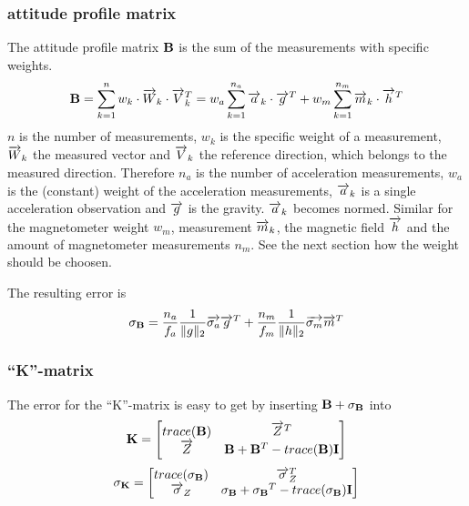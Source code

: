 \subsubsection*{attitude profile matrix}
The attitude profile matrix $ \mathbf{B} $ is the sum of the measurements with specific weights.
\begin{equation}\label{attitude profile matrix}
\mathbf{B} = \sum_{k=1}^n w_k \cdot \overrightarrow{W}_k \cdot \overrightarrow{V}_k^{T} = w_a \sum_{k=1}^{n_a} \overrightarrow{a}_k \cdot \overrightarrow{g}^{T}  +  w_m \sum_{k=1}^{n_m} \overrightarrow{m}_k \cdot \overrightarrow{h}^{T}
\end{equation}
$n$ is the number of measurements, $w_k$ is the specific weight of a measurement, $\overrightarrow{W}_k$ the measured vector and $\overrightarrow{V}_k$ the reference direction, which belongs to the measured direction. Therefore $n_a$ is the number of acceleration measurements, $w_a$ is the (constant) weight of the acceleration measurements, $\overrightarrow{a}_k$ is a single acceleration observation and $\overrightarrow{g}$ is the gravity. $\overrightarrow{a}_k$ becomes normed. Similar for the magnetometer weight $w_m$, measurement $\overrightarrow{m}_k$, the magnetic field $\overrightarrow{h}$ and the amount of magnetometer measurements $n_m$. See the next section how the weight should be choosen.

The resulting error is 
\begin{equation}
\mathbf{\sigma_B} = \frac{n_a}{f_a} \frac{1}{\Vert{g}\Vert_2} \overrightarrow{\sigma_a}\overrightarrow{g}^{T} + \frac{n_m}{f_m} \frac{1}{\Vert{h}\Vert_2} \overrightarrow{\sigma_m}\overrightarrow{m}^{T}
\end{equation}
\subsubsection*{``K''-matrix}
The error for the ``K''-matrix is easy to get by inserting $ \mathbf{B} + \mathbf{\sigma_B} $ into
\begin{equation}
\mathbf{K} = \begin{bmatrix}
trace(\mathbf{B}) & \overrightarrow{Z}^{T} \\
\overrightarrow{Z} & \mathbf{B} + \mathbf{B}^{T} - trace(\mathbf{B}) \mathbf{I}
\end{bmatrix}
\end{equation}
\begin{equation}
\mathbf{\sigma_K} = \begin{bmatrix}
trace(\mathbf{\sigma_B}) & \overrightarrow{\sigma}_Z^{T} \\
\overrightarrow{\sigma}_Z & \mathbf{\sigma_B} + \mathbf{\sigma_B}^{T} - trace(\mathbf{\sigma_B}) \mathbf{I}
\end{bmatrix}
\end{equation}

